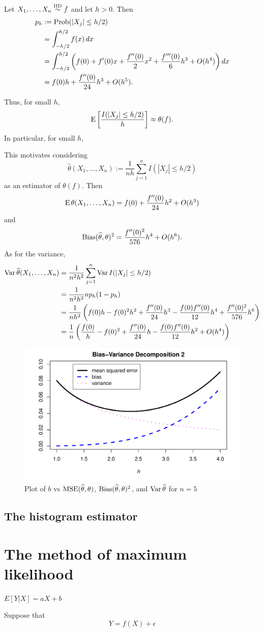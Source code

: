 \documentclass[12pt]{amsart}
\begin{document}
Let $X_1,\ldots,X_n\overset{\text{\textsc{IID}}}\sim f$ and let $h>0$. Then
\begin{align*}
    p_h &:= \operatorname{Prob}(|X_j|\leq h/2)\\ &= \int_{-h/2}^{h/2}f(x)\, dx\\
    &= \int_{-h/2}^{h/2} \left(f(0) + f'(0)x + \frac{f''(0)}2 x^2 + \frac{f'''(0)}6 h^3 + O(h^4)\right) dx\\
    &= f(0)h + \frac{f''(0)}{24}h^3 + O(h^5).
\end{align*}
    
Thus, for small $h$,
\[
    \operatorname{E} \left[\frac{I(|X_j|\leq h/2)}h\right]\approx \theta(f).
\]
In particular, for small $h$,

This motivates considering
\[
    \hat\theta(X_1,\ldots,X_n) := \frac1{nh}\sum_{j=1}^nI(|X_j|\leq h/2)
\]
as an estimator of $\theta(f)$.
Then
\[
    \operatorname{E}\theta(X_1,\ldots,X_n) = f(0) + \frac{f''(0)}{24}h^2 + O(h^3)
\]
and
\[
    \operatorname{Bias}(\widehat\theta, \theta)^2 = \frac{f''(0)^2}{576}h^4 + O(h^6).
\]
As for the variance,
\begin{align*}
    \operatorname{Var} \widehat\theta(X_1,\ldots,X_n) &= \frac1{n^2h^2}\sum_{j=1}^n \operatorname{Var} I(|X_j|\leq h/2)\\
    &= \frac1{n^2h^2}n p_h(1-p_h)\\
    &= \frac1{nh^2}\left(f(0)h - f(0)^2h^2 + \frac{f''(0)}{24}h^3 - \frac{f(0)f''(0)}{12}h^4 + \frac{f''(0)^2}{576}h^6\right)\\
    &= \frac1n\left(\frac{f(0)}h - f(0)^2 + \frac{f''(0)}{24}h - \frac{f(0)f''(0)}{12}h^2 + O(h^4)\right)
\end{align*}

\begin{figure}
    \includegraphics[scale=0.94]{bias-variance-decomposition-2.pdf}
    \caption{Plot of $b$ vs $\operatorname{MSE}(\widehat\theta, \theta)$, $\operatorname{Bias}(\widehat\theta, \theta)^2$, and $\operatorname{Var} \widehat\theta$ for $n=5$}
\end{figure}


\subsection{The histogram estimator}

\section{The method of maximum likelihood}

$E[Y|X] = aX+b$

Suppose that 
\[
    Y = f(X)+\epsilon
\]
\end{document}
